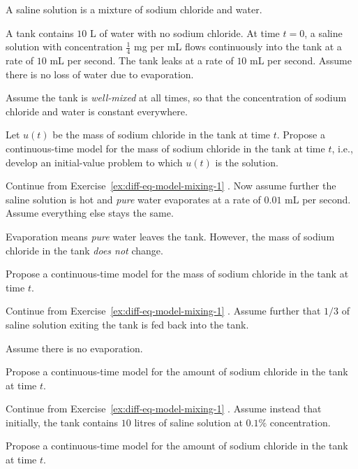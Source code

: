 \documentclass[../main.tex]{subfiles}
\begin{document}
\begin{exercise} \label{ex:diff-eq-model-mixing-1}
  A saline solution is a mixture of sodium chloride and water. 

  A tank contains \(10\) L of water with no sodium chloride. At time \(t = 0\), a saline solution with concentration \(\tfrac{1}{4}\) mg per mL flows continuously into the tank at a rate of \(10\) mL per second. The tank leaks at a rate of \(10\) mL per second. Assume there is no loss of water due to evaporation.

  Assume the tank is \emph{well-mixed} at all times, so that the concentration of sodium chloride and water is constant everywhere. 

  Let \(u(t)\) be the mass of sodium chloride in the tank at time \(t\).  
  Propose a continuous-time model for the mass of sodium chloride in the tank at time \(t\), i.e., develop an initial-value problem to which \(u(t)\) is the solution. 

  \blanks*
\end{exercise}
\clearpage

\begin{exercise} \label{ex:diff-eq-model-mixing-2}
  Continue from Exercise~\ref{ex:diff-eq-model-mixing-1} . Now assume further the saline solution is hot and \emph{pure} water evaporates at a rate of \(0.01\) mL per second.  Assume everything else stays the same.

  Evaporation means \emph{pure} water leaves the tank. However, the mass of sodium chloride in the tank \emph{does not} change.

  Propose a continuous-time model for the mass of sodium chloride in the tank at time \(t\). 

  \blanks*
\end{exercise}
\clearpage

\begin{exercise} \label{ex:diff-eq-model-mixing-3}
  Continue from Exercise~\ref{ex:diff-eq-model-mixing-1} . Assume further that \(1/3\) of saline solution exiting the tank is fed back into the tank.

  Assume there is no evaporation.

  Propose a continuous-time  model for the amount of sodium chloride in the tank at time \(t\). 

  \blanks*
\end{exercise}
\clearpage

\begin{exercise} \label{ex:diff-eq-model-mixing-4}
  Continue from Exercise~\ref{ex:diff-eq-model-mixing-1} . Assume instead that initially, the tank contains \(10\) litres of saline solution at \(0.1\%\) concentration.

  Propose a continuous-time model for the amount of sodium chloride in the tank at time \(t\).

  \blanks*
\end{exercise}
\clearpage
\end{document}
